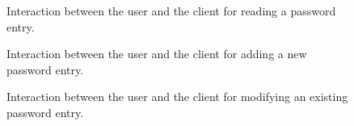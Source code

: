 \documentclass[../report.tex]{subfiles}
\begin{document}
\begin{figure}[h]
 \centering

 \setlength{\fboxsep}{10pt}
 \setlength{\fboxrule}{1pt}

 \caption{Interaction between the user and the client for reading a password entry.}
 \label{fig:usecase_read}
\end{figure}



\begin{figure}[h]
 \centering

 \setlength{\fboxsep}{10pt}
 \setlength{\fboxrule}{1pt}

 \caption{Interaction between the user and the client for adding a new password entry.}
 \label{fig:usecase_add}
\end{figure}



\begin{figure}[h]
 \centering

 \setlength{\fboxsep}{10pt}
 \setlength{\fboxrule}{1pt}

 \caption{Interaction between the user and the client for modifying an existing password entry.}
 \label{fig:usecase_modify}
\end{figure}
\end{document}
